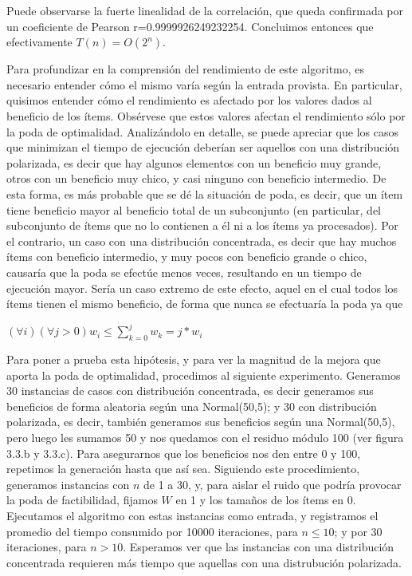 \documentclass[a4paper]{article}
\begin{document}
Puede observarse la fuerte linealidad de la correlación, que queda confirmada por un coeficiente de Pearson r=0.9999926249232254. Concluimos entonces que efectivamente  $T(n) = O(2^n)$. 

Para profundizar en la comprensión del rendimiento de este algoritmo, es necesario entender cómo el mismo varía según la entrada provista. En particular, quisimos entender cómo el rendimiento es afectado por los valores dados al beneficio de los ítems. Obsérvese que estos valores afectan el rendimiento sólo por la poda de optimalidad. Analizándolo en detalle, se puede apreciar que los casos que minimizan el tiempo de ejecución deberían ser aquellos con una distribución polarizada, es decir que hay algunos elementos con un beneficio muy grande, otros con un beneficio muy chico, y casi ninguno con beneficio intermedio. De esta forma, es más probable que se dé la situación de poda, es decir, que un ítem tiene beneficio mayor al beneficio total de un subconjunto (en particular, del subconjunto de ítems que no lo contienen a él ni a los ítems ya procesados). Por el contrario, un caso con una distribución concentrada, es decir que hay muchos ítems con beneficio intermedio, y muy pocos con beneficio grande o chico, causaría que la poda se efectúe menos veces, resultando en un tiempo de ejecución mayor. Sería un caso extremo de este efecto, aquel en el cual todos los ítems tienen el mismo beneficio, de forma que nunca se efectuaría la poda 
ya que 
\skip
\begin{center}
    $(\forall{i})(\forall{j}> 0)  w_i \leq \sum_{k = 0}^{j} w_k = j * w_i $
\end{center}

\skip

Para poner a prueba esta hipótesis, y para ver la magnitud de la mejora que aporta la poda de optimalidad, procedimos al siguiente experimento. Generamos 30 instancias de casos con distribución concentrada, es decir generamos sus beneficios de forma aleatoria según una Normal(50,5); y 30 con distribución polarizada, es decir, también generamos sus beneficios según una Normal(50,5), pero luego les sumamos 50 y nos quedamos con el residuo módulo 100 (ver figura 3.3.b y 3.3.c). Para asegurarnos que los beneficios nos den entre 0 y 100, repetimos la generación hasta que así sea. Siguiendo este procedimiento, generamos instancias con $n$ de 1 a 30, y, para aislar el ruido que podría provocar la poda de factibilidad, fijamos $W$ en 1 y los tamaños de los ítems en 0. Ejecutamos el algoritmo con estas instancias como entrada, y registramos el promedio del tiempo consumido por 10000 iteraciones, para $n \leq 10$; y por 30 iteraciones, para $n > 10$. Esperamos ver que las instancias con una distribución concentrada requieren más tiempo que aquellas con una distrubución polarizada.
\end{document}

